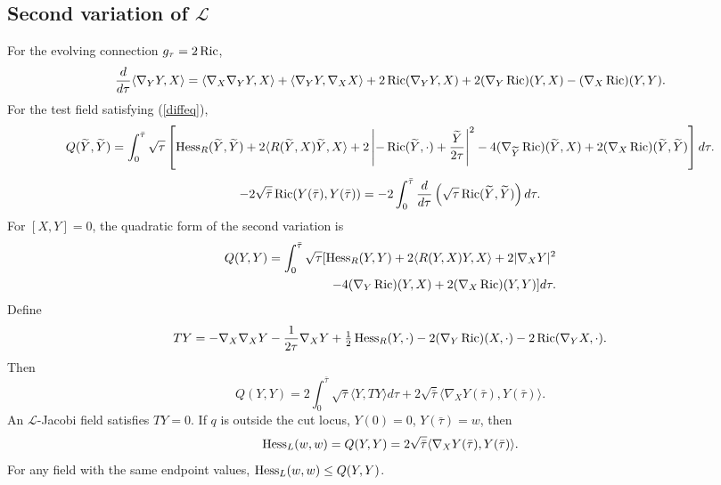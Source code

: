 \subsection{Second variation of ${\mathcal L}$}
For the evolving connection $g_\tau=2\operatorname{Ric}$,
\begin{equation}\label{xxx}
{d\over d\tau}\langle\nabla_YY,X\rangle
=\langle\nabla_X\nabla_YY,X\rangle+\langle\nabla_YY,\nabla_XX\rangle
+2\operatorname{Ric}(\nabla_YY,X)+2(\nabla_Y\operatorname{Ric})(Y,X)-(\nabla_X\operatorname{Ric})(Y,Y).
\end{equation}
For the test field satisfying (\ref{diffeq}),
\begin{equation}\label{sub1}
Q(\widetilde Y,\widetilde Y)=\int_0^{\bar\tau}\sqrt\tau\left[
\operatorname{Hess}_R(\widetilde Y,\widetilde Y)+2\langle R(\widetilde Y,X)\widetilde Y,X\rangle
+2\left|-\operatorname{Ric}(\widetilde Y,\cdot)+{\widetilde Y\over2\tau}\right|^2
-4(\nabla_{\widetilde Y}\operatorname{Ric})(\widetilde Y,X)+2(\nabla_X\operatorname{Ric})(\widetilde Y,\widetilde Y)\right]d\tau.
\end{equation}
\begin{equation}\label{sub2}
-2\sqrt{\bar\tau}\operatorname{Ric}(Y(\bar\tau),Y(\bar\tau))
=-2\int_0^{\bar\tau}{d\over d\tau}\left(\sqrt\tau\operatorname{Ric}(\widetilde Y,\widetilde Y)\right)d\tau.
\end{equation}
For $[X,Y]=0$, the quadratic form of the second variation is
\begin{align}\label{Hess}
Q(Y,Y)=\int_0^{\bar\tau}\sqrt\tau[\operatorname{Hess}_R(Y,Y)+2\langle R(Y,X)Y,X\rangle+2|\nabla_XY|^2\\
-4(\nabla_Y\operatorname{Ric})(Y,X)+2(\nabla_X\operatorname{Ric})(Y,Y)]d\tau.
\end{align}
Define
\begin{equation}
TY=-\nabla_X\nabla_XY-{1\over2\tau}\nabla_XY+\tfrac12\operatorname{Hess}_R(Y,\cdot)
-2(\nabla_Y\operatorname{Ric})(X,\cdot)-2\operatorname{Ric}(\nabla_YX,\cdot).
\end{equation}
Then
\begin{equation}\label{Qeqn}Q(Y,Y)=2\int_0^{\bar\tau}\sqrt\tau\langle Y,TY\rangle d\tau
+2\sqrt{\bar\tau}\langle\nabla_XY(\bar\tau),Y(\bar\tau)\rangle.
\end{equation}
An ${\mathcal L}$-Jacobi field satisfies $TY=0$. If $q$ is outside the cut locus,
$Y(0)=0$, $Y(\bar\tau)=w$, then
\begin{equation}\label{hesseq}\operatorname{Hess}_L(w,w)=Q(Y,Y)=2\sqrt{\bar\tau}\langle\nabla_XY(\bar\tau),Y(\bar\tau)\rangle.
\end{equation}
For any field with the same endpoint values, $\operatorname{Hess}_L(w,w)\le Q(Y,Y)$.


